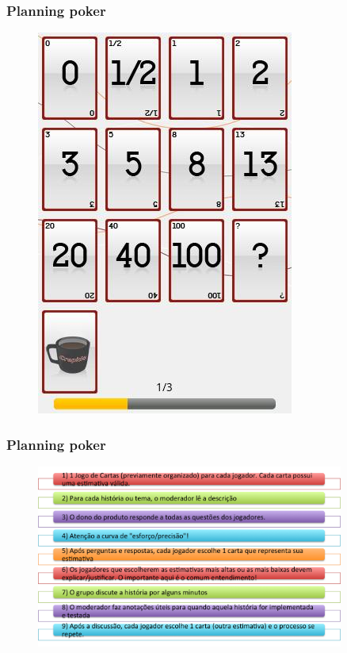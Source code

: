\begin{frame}
 \frametitle{Planning poker}
  \begin{figure}
   \centering
   \includegraphics[height = \textheight]{figs/1352540079_screen.jpg}
  \end{figure}
\end{frame}

\begin{frame}
 \frametitle{Planning poker}
  \begin{figure}
   \centering
   \includegraphics[width = 0.9\textwidth]{figs/planning_poker_aglo.png}
  \end{figure}
\end{frame}

